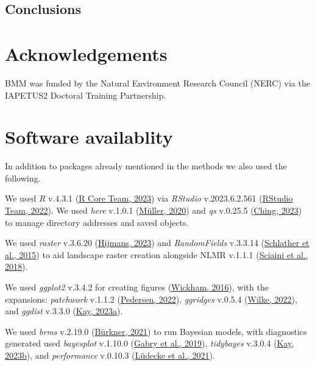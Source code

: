 \documentclass[10pt,a4paper]{article}
\begin{document}
\hypertarget{conclusions}{%
\subsection{Conclusions}\label{conclusions}}

\hypertarget{acknowledgements}{%
\section{Acknowledgements}\label{acknowledgements}}

BMM was funded by the Natural Environment Research Council (NERC) via the IAPETUS2 Doctoral Training Partnership.

\hypertarget{software-availablity}{%
\section{Software availablity}\label{software-availablity}}

In addition to packages already mentioned in the methods we also used the following.

We used \emph{R} v.4.3.1 (\protect\hyperlink{ref-base}{R Core Team, 2023}) via \emph{RStudio} v.2023.6.2.561 (\protect\hyperlink{ref-rstudio}{RStudio Team, 2022}).
We used \emph{here} v.1.0.1 (\protect\hyperlink{ref-here}{Müller, 2020}) and \emph{qs} v.0.25.5 (\protect\hyperlink{ref-qs}{Ching, 2023}) to manage directory addresses and saved objects.

We used \emph{raster} v.3.6.20 (\protect\hyperlink{ref-raster}{Hijmans, 2023}) and \emph{RandomFields} v.3.3.14 (\protect\hyperlink{ref-RandomFields}{Schlather et al., 2015}) to aid landscape raster creation alongside NLMR v.1.1.1 (\protect\hyperlink{ref-NLMR}{Sciaini et al., 2018}).

We used \emph{ggplot2} v.3.4.2 for creating figures (\protect\hyperlink{ref-ggplot2}{Wickham, 2016}), with the expansions: \emph{patchwork} v.1.1.2 (\protect\hyperlink{ref-patchwork}{Pedersen, 2022}), \emph{ggridges} v.0.5.4 (\protect\hyperlink{ref-ggridges}{Wilke, 2022}), and \emph{ggdist} v.3.3.0 (\protect\hyperlink{ref-ggdist}{Kay, 2023a}).

We used \emph{brms} v.2.19.0 (\protect\hyperlink{ref-brms}{Bürkner, 2021}) to run Bayesian models, with diagnostics generated used \emph{bayesplot} v.1.10.0 (\protect\hyperlink{ref-bayesplot}{Gabry et al., 2019}), \emph{tidybayes} v.3.0.4 (\protect\hyperlink{ref-tidybayes}{Kay, 2023b}), and \emph{performance} v.0.10.3 (\protect\hyperlink{ref-performance}{Lüdecke et al., 2021}).
\end{document}
